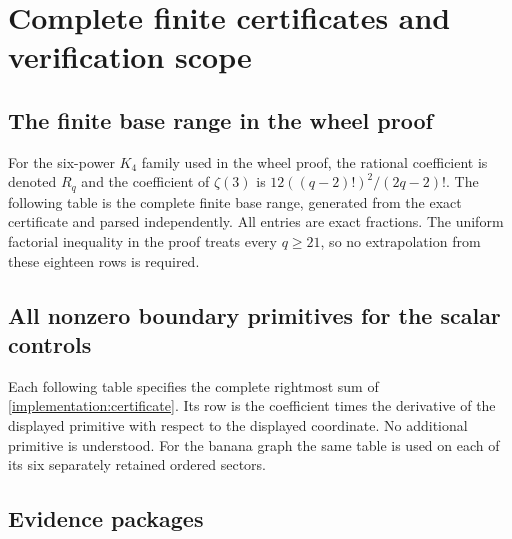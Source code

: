 \section{Complete finite certificates and verification scope}
\label{app:certificates}

\subsection{The finite base range in the wheel proof}

For the six-power $K_4$ family used in the wheel proof,
the rational coefficient is denoted $R_q$ and the coefficient
of $\zeta(3)$ is $12((q-2)!)^2/(2q-2)!$.
The following table is the complete finite base range, generated
from the exact certificate and parsed independently. All entries
are exact fractions. The uniform factorial inequality in the
proof treats every $q\ge21$, so no extrapolation from these
eighteen rows is required.
\begingroup\small

\endgroup

\clearpage
\subsection{All nonzero boundary primitives for the scalar controls}

Each following table specifies the complete rightmost sum of
\eqref{implementation:certificate}. Its row is the coefficient
times the derivative of the displayed primitive with respect
to the displayed coordinate. No additional primitive is
understood. For the banana graph the same table is used on each
of its six separately retained ordered sectors.


\clearpage
\subsection{Evidence packages}

